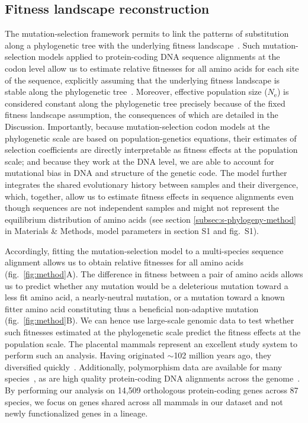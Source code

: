 \documentclass{article}
\newcommand{\Ne}{N_{\text{e}}}
\begin{document}
    \subsection*{Fitness landscape reconstruction}

    The mutation-selection framework permits to link the patterns of substitution along a phylogenetic tree with the underlying fitness landscape~\cite{halpern_evolutionary_1998, mccandlish_modeling_2014}.
    Such mutation-selection models applied to protein-coding DNA sequence alignments at the codon level allow us to estimate relative fitnesses for all amino acids for each site of the sequence, explicitly assuming that the underlying fitness landscape is stable along the phylogenetic tree~\cite{rodrigue_mechanistic_2010, tamuri_estimating_2012, rodrigue_detecting_2017}.
    Moreover, effective population size ($\Ne$) is considered constant along the phylogenetic tree precisely because of the fixed fitness landscape assumption, the consequences of which are detailed in the Discussion.
    Importantly, because mutation-selection codon models at the phylogenetic scale are based on population-genetics equations, their estimates of selection coefficients are directly interpretable as fitness effects at the population scale; and because they work at the DNA level, we are able to account for mutational bias in DNA and structure of the genetic code.
    The model further integrates the shared evolutionary history between samples and their divergence, which, together, allow us to estimate fitness effects in sequence alignments even though sequences are not independent samples and might not represent the equilibrium distribution of amino acids (see section \ref{subsec:s-phylogeny-method} in Materials \& Methods, model parameters in section S1 and fig.~S1).

    Accordingly, fitting the mutation-selection model to a multi-species sequence alignment allows us to obtain relative fitnesses for all amino acids (fig.~\ref{fig:method}A).
    The difference in fitness between a pair of amino acids allows us to predict whether any mutation would be a deleterious mutation toward a less fit amino acid, a nearly-neutral mutation, or a mutation toward a known fitter amino acid constituting thus a beneficial non-adaptive mutation (fig.~\ref{fig:method}B).
    We can hence use large-scale genomic data to test whether such fitnesses estimated at the phylogenetic scale predict the fitness effects at the population scale.
    The placental mammals represent an excellent study system to perform such an analysis.
    Having originated $\sim$102 million years ago, they diversified quickly~\cite{foley_genomic_2023}.
    Additionally, polymorphism data are available for many species~\cite{howe_ensembl_2021}, as are high quality protein-coding DNA alignments across the genome~\cite{ranwez_orthomam_2007, scornavacca_orthomam_2019}.
    By performing our analysis on 14,509 orthologous protein-coding genes across 87 species, we focus on genes shared across all mammals in our dataset and not newly functionalized genes in a lineage.
\end{document}
